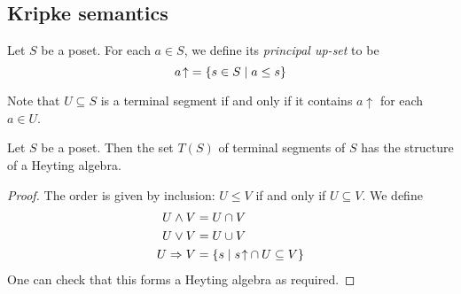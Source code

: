\subsection{Kripke semantics}
\begin{definition}
    Let \( S \) be a poset.
    For each \( a \in S \), we define its \emph{principal up-set} to be
    \[ {a\!\uparrow} = \qty{s \in S \mid a \leq s} \]
\end{definition}
Note that \( U \subseteq S \) is a terminal segment if and only if it contains \( a\!\uparrow \) for each \( a \in U \).
\begin{proposition}
    Let \( S \) be a poset.
    Then the set \( T(S) \) of terminal segments of \( S \) has the structure of a Heyting algebra.
\end{proposition}
\begin{proof}
    The order is given by inclusion: \( U \leq V \) if and only if \( U \subseteq V \).
    We define
    \begin{align*}
        U \wedge V &= U \cap V \\
        U \vee V &= U \cup V \\
        U \Rightarrow V &= \qty{s \mid {s\!\uparrow} \cap U \subseteq V}
    \end{align*}
    One can check that this forms a Heyting algebra as required.
\end{proof}
